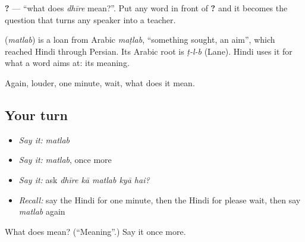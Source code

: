 \textbf{    ?} — \textquotedblleft{}what does \emph{dhīre} mean?\textquotedblright{}. Put any word in front of \textbf{   ?} and it becomes the question that turns any speaker into a teacher.

\begin{cousinweb}
\textbf{} (\emph{matlab}) is a loan from Arabic \emph{maṭlab}, \textquotedblleft{}something sought, an aim\textquotedblright{}, which reached Hindi through Persian. Its Arabic root is \emph{ṭ-l-b} (Lane). Hindi uses it for what a word aims at: its meaning.
\end{cousinweb}

\begin{grammarlens}[title={What you've built}]
Again, louder, one minute, wait, what does it mean.
\end{grammarlens}

\subsection*{Your turn}
\begin{itemize}
\raggedright
  \item \emph{Say it:} \emph{matlab}
  \item \emph{Say it:} \emph{matlab}, once more
  \item \emph{Say it:} ask \emph{dhīre kā matlab kyā hai?}
  \item \emph{Recall:} say the Hindi for one minute, then the Hindi for please wait, then say \emph{matlab} again
\end{itemize}

\begin{tcolorbox}[breakable,colback=teal!4,colframe=teal!35!black,title={Before you move on}]
What does  mean? (\textquotedblleft{}Meaning\textquotedblright{}.) Say it once more.
\end{tcolorbox}
